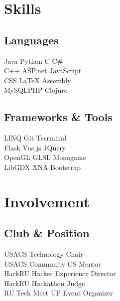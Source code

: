 \documentclass[]{deedy-resume-openfont}
\begin{document}
\begin{minipage}[t]{0.33\textwidth}

\section{Skills}
\subsection{Languages}
Java \textbullet{} Python \textbullet{} C \textbullet{} C\# \\
C++ \textbullet{} ASP.net \textbullet{} JavaScript \\ 
CSS \textbullet{} \LaTeX \textbullet{} Assembly \\
MySQL\textbullet{}PHP \textbullet{}Clojure\\
\sectionsep
\sectionsep
\subsection{Frameworks \& Tools}
LINQ\textbullet{}  Git  \textbullet{} Terrminal\\
Flask\textbullet{} Vue.js\textbullet{} JQuery \\ 
OpenGL \textbullet{} GLSL \textbullet{} Monogame \\
LibGDX \textbullet{} XNA \textbullet{} Bootstrap\\
\sectionsep


\section{Involvement} 
\subsection{Club \& Position }
USACS\textbullet{} Technology Chair \\ 
USACS\textbullet{} Community CS Mentor \\ 
HackRU \textbullet{} Hacker Experience Director \\
HackRU  \textbullet{} Hackathon Judge \\
RU Tech Meet UP\textbullet{} Event Organizer \\ 
\sectionsep

%
%

\end{minipage} 
\end{document}
